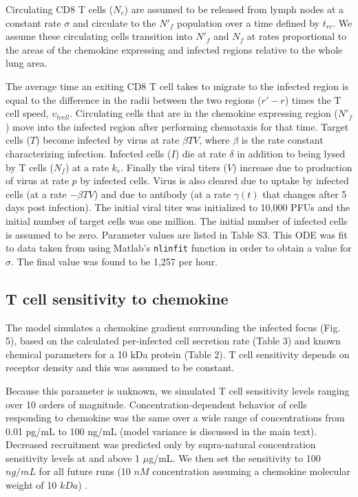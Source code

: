 \documentclass[10pt]{article}
\begin{document}
Circulating CD8 T cells ($N_{c}$) are assumed to be released from lymph nodes at a constant rate $\sigma$ and circulate to the $N'_{f}$ population over a time defined by $t_{rc}$. We assume these circulating cells transition into $N'_{f}$ and $N_{f}$ at rates proportional to the areas of the chemokine expressing and infected regions relative to the whole lung area. 

The average time an exiting CD8 T cell takes to migrate to the infected region is equal to the difference in the radii between the two regions ($r' - r$) times the T cell speed, $v_{tcell}$.  Circulating cells that are in the chemokine expressing region ($N'_{f}$) move into the infected region after performing chemotaxis for that time. Target cells ($T$) become infected by virus at rate $\beta TV$, where $\beta$ is the rate constant characterizing infection. Infected cells ($I$) die at rate $\delta$ in addition to being lysed by T cells ($N_{f}$) at a rate $k_{e}$. Finally the viral titers ($V$) increase due to production of virus at rate $p$ by infected cells. Virus is also cleared due to uptake by infected cells (at a rate $- \beta TV$) and due to antibody (at a rate $\gamma (t)$ that changes after 5 days post infection). The initial viral titer was initialized to 10,000 PFUs and the initial number of target cells was one million. The initial number of infected cells is assumed to be zero. Parameter values are listed in Table S3.  This ODE was fit to data taken from \cite{Miao2010} using Matlab's \texttt{nlinfit} function in order to obtain a value for $\sigma$.  The final value was found to be 1,257 per hour.

\subsection{T cell sensitivity to chemokine}

The model simulates a chemokine gradient surrounding the infected focus (Fig. 5), based on the calculated per-infected cell secretion rate (Table 3) and known chemical parameters for a 10 kDa protein (Table 2).  T cell sensitivity depends on receptor density \cite{Desmetz2006} and this was assumed to be constant.

Because this parameter is unknown, we simulated T cell sensitivity levels ranging over 10 orders of magnitude.  Concentration-dependent behavior of cells responding to chemokine was the same over a wide range of concentrations from 0.01 pg/mL to 100 ng/mL (model variance is discussed in the main text).  Decreased recruitment was predicted only by supra-natural concentration sensitivity levels at and above 1 $\mu$g/mL.  We then set the sensitivity to 100 $ng/mL$ for all future runs (10 $nM$ concentration assuming a chemokine molecular weight of 10 $kDa$) \cite{Gao2003}.  
\end{document}
